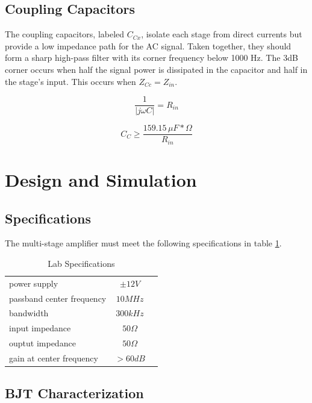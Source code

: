 \documentclass[titlepage, letterpaper, 10.5pt]{article}
\begin{document}
\subsection{Coupling Capacitors}

The coupling capacitors, labeled $C_{Cx}$, isolate each stage from
direct currents but provide a low impedance path for the AC signal.
Taken together, they should form a sharp high-pass filter with its
corner frequency below 1000 Hz. The 3dB corner occurs when half the
signal power is dissipated in the capacitor and half in the stage's
input. This occurs when $Z_{Cc}=Z_{in}$.

\begin{equation*}
\frac{1}{|j\omega C|}=R_{in}
\end{equation*}

\begin{equation}
C_{C}\geq \frac{159.15\,\mu F*\Omega}{R_{in}}
\label{couplingCapacitors}
\end{equation}

\section{Design and Simulation}

\subsection{Specifications}

The multi-stage amplifier must meet the following specifications in
table \ref{labSpecs}.

\begin{table}[ht]
\centering
\caption{Lab Specifications}
\begin{tabular}{l c c}
\hline
power supply			&$\pm 12V$	\\
passband center frequency	&$10MHz$	\\
bandwidth			&$300kHz$	\\
input impedance			&$50\Omega$	\\
ouptut impedance		&$50\Omega$	\\
gain at center frequency	&$>60dB$	\\
\hline
\end{tabular}
\label{labSpecs}
\end{table}

\subsection{BJT Characterization}
\end{document}

